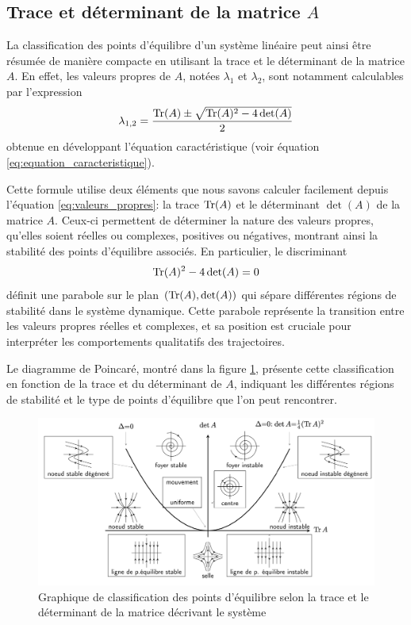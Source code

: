        \subsection{Trace et déterminant de la matrice $A$}
            La classification des points d'équilibre d'un système linéaire peut ainsi être résumée de manière compacte en utilisant la trace et le déterminant de la matrice $A$. En effet, les valeurs propres de $A$, notées $\lambda_1$ et $\lambda_2$, sont notamment calculables par l'expression
            \begin{equation}
                \lambda_{1,2} = \frac{\operatorname{Tr}(A) \pm \sqrt{\operatorname{Tr}(A)^2 - 4 \det(A)}}{2}
            \end{equation}
            obtenue en développant l'équation caractéristique (voir équation \ref{eq:equation_caracteristique}).
            
            Cette formule utilise deux éléments que nous savons calculer facilement depuis l'équation \ref{eq:valeurs_propres}: la trace $\operatorname{Tr}(A)$ et le déterminant $\det(A)$ de la matrice $A$. Ceux-ci permettent de déterminer la nature des valeurs propres, qu'elles soient réelles ou complexes, positives ou négatives, montrant ainsi la stabilité des points d'équilibre associés. En particulier, le discriminant 
            \begin{equation}
                \operatorname{Tr}(A)^2 - 4 \det(A) = 0
            \end{equation}
            définit une parabole sur le plan $(\operatorname{Tr}(A), \det(A))$ qui sépare différentes régions de stabilité dans le système dynamique. Cette parabole représente la transition entre les valeurs propres réelles et complexes, et sa position est cruciale pour interpréter les comportements qualitatifs des trajectoires. 

            Le diagramme de Poincaré, montré dans la figure \ref{fig:poincare}, présente cette classification en fonction de la trace et du déterminant de $A$, indiquant les différentes régions de stabilité et le type de points d'équilibre que l'on peut rencontrer.
            \begin{figure}[ht!]
                \centering
                \includegraphics[width=\textwidth]{images/poincare.png}
                \caption{Graphique de classification des points d'équilibre selon la trace et le déterminant de la matrice décrivant le système}
                \label{fig:poincare}
            \end{figure}

